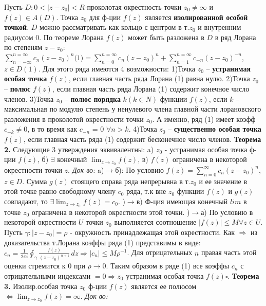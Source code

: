 Пусть $D:0<|z-z_0|<R$-проколотая окрестность точки $z_0\neq\infty$ и $f(z) \in A(D)$. Точка $z_0$ для ф-ции $f(z)$ является \textbf{изолированной особой точкой}. $D$ можно рассматривать как кольцо с центром в т.$z_0$ и внутренним радиусом 0. По теореме Лорана $f(z)$ может быть разложена в $D$ в ряд Лорана по степеням $z-z_0$: $\sum_{n=-\infty}^{n=\infty}c_n(z-z_0)^n\text{(1)}=\sum_{n=0}^{n=\infty}c_n(z-z_0)^n +\sum_{n=1}^{n=\infty}c_{-n}(z-z_0)^{-n}$, $z \in D(1)$.
Для этого ряда имеются 4 возможности:
    1)Точка $z_0$ – \textbf{устранимая особая точка} $f(z)$, если главная часть ряда Лорана (1) равна нулю.
    2)Точка $z_0$ – \textbf{полюс} $f(z)$, если главная часть ряда Лорана (1) содержит конечное число членов.    
    3)Точка $z_0$ – \textbf{полюс порядка} $k (k \in N)$ функции $f(z)$, если $k$
– максимальная по модулю степень у ненулевого члена главной части лорановского разложения в проколотой окрестности точки $z_0$. А именно, ряд (1) имеет коэфф $c_{-k}\neq 0$,
в то время как $c_{-n}$ = 0 $\forall n > k$.
    4)Точка $z_0$ – \textbf{существенно особая точка} $f(z)$, если
главная часть ряда (1) содержит бесконечное число членов.
\textbf{Теорема 2.} Следующие 3 утверждения эквивалентны: a) $z_0$ - устранимая особая точка ф-ции $f(z)$, б) $\exists$ конечный $\displaystyle\lim_{z\rightarrow z_0}f(z)$, в) $f(z)$ ограничена в некоторой окрестности точки $z$.
\textit{Док-во:}
    a)$\rightarrow$б): По условию $f(z)=\sum_{n=0}^{\infty}c_n(z-z_0)^n$, $z \in D$. Сумма $g(z)$ стоящего справа ряда непрерывна в т.$z_0$ и ее значение в этой точке равно свободному члену $c_0$ ряда, т.к вне $z_0$ функции $f(z)$ и $g(z)$ совпадают, то $\exists \displaystyle\lim_{z\rightarrow z_0}f(z)=c_0$.
    )$\rightarrow$в) Ф-ция имеющая конечный $lim$ в точке $z_0$ ограничена в некоторой окрестности этой точки.
    )$\rightarrow$а) По условию в некоторой окрестности $U$ точки $z_0$ выполняется соотношение $|f(z)|\leq M \forall z \in U$. Пусть $\gamma:|z-z_0|=\rho$ - окружность принадлежащая этой окрестности. Как $\Rightarrow$ из доказательства т.Лорана коэффы ряда (1) представимы в виде: $c_n = \frac{1}{2\pi i} \oint_{\gamma} \frac{f(z)}{(z-z_0)^{n+1}} \,dz \Rightarrow |c_n|\leq M\rho^{-1}$. Для отрицательных $n$ правая часть этой оценки стремится к 0 при $\rho \rightarrow 0$. Таким образом в ряде (1) все коэффы $c_n$ с отрицательными индексами $=0\Rightarrow z_0$ устранимая особая точка $f(z) \square$. 
\textbf{Теорема 3.} Изолир.особая точка $z_0$ ф-ции $f(z)$ является ее полюсом $\Longleftrightarrow \displaystyle\lim_{z\rightarrow z_0}f(z)=\infty$.
\textit{Док-во:}
